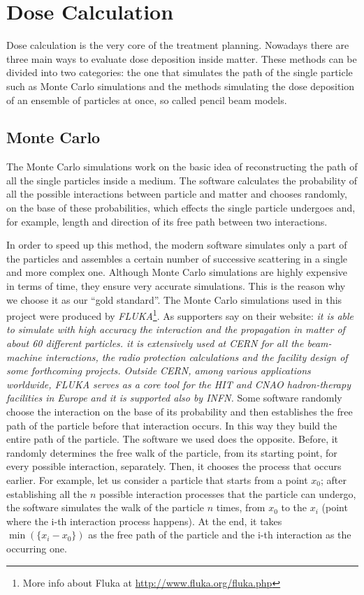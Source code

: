 \documentclass[12pt, a4paper, twoside]{book}
\begin{document}
\section{Dose Calculation}
Dose calculation is the very core of the treatment planning. 
Nowadays there are three main ways to evaluate dose deposition inside matter. These methods can be divided into two categories: the one that simulates the path of the single particle such as Monte Carlo simulations and the methods simulating the dose deposition of an ensemble of particles at once, so called pencil beam models.



\subsection{Monte Carlo}
The Monte Carlo simulations work on the basic idea of reconstructing the path of all the single particles inside a medium. The software calculates the probability of all the possible interactions between particle and matter and chooses randomly, on the base of these probabilities, which effects the single particle undergoes and, for example, length and direction of its free path between two interactions.

In order to speed up this method, the modern software simulates only a part of the particles and assembles a certain number of successive scattering in a single and more complex one. Although Monte Carlo simulations are highly expensive in terms of time, they ensure very accurate simulations. This is the reason why we choose it as our ``gold standard''.
The Monte Carlo simulations used in this project were produced by \emph{FLUKA}\footnote{More info about Fluka at \url{http://www.fluka.org/fluka.php}}. As supporters say on their website: \emph{it is able to simulate with high accuracy the interaction and the propagation in matter of about 60 different particles. it is extensively used at CERN for all the beam-machine interactions, the radio protection calculations and the facility design of some forthcoming projects. 
Outside CERN, among various applications worldwide, FLUKA serves as a core tool for the HIT and CNAO hadron-therapy facilities in Europe and it is supported also by \emph{INFN}.}
Some software randomly choose the interaction on the base of its probability and then establishes the free path of the particle before that interaction occurs. In this way they build the entire path of the particle.
The software we used does the opposite. Before, it randomly determines the free walk of the particle, from its starting point, for every possible interaction, separately.
Then, it chooses the process that occurs earlier.
For example, let us consider a particle that starts from a point $x_0$; after establishing all the $n$ possible interaction processes that the particle can undergo, the software simulates the walk of the particle $n$ times, from $x_0$ to the $x_i$ (point where the i-th interaction process happens). At the end, it takes $\min(\{ x_i-x_0 \})$ as the free path of the particle and the i-th interaction as the occurring one.
\end{document}
